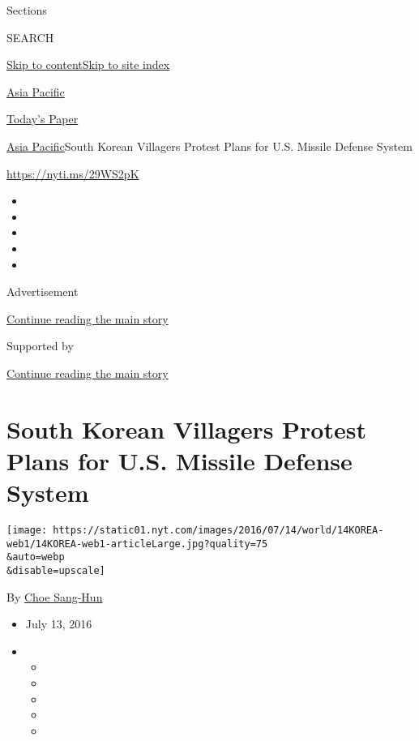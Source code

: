 Sections

SEARCH

\protect\hyperlink{site-content}{Skip to
content}\protect\hyperlink{site-index}{Skip to site index}

\href{https://www.nytimes.com/section/world/asia}{Asia Pacific}

\href{https://myaccount.nytimes.com/auth/login?response_type=cookie\&client_id=vi}{}

\href{https://www.nytimes.com/section/todayspaper}{Today's Paper}

\href{/section/world/asia}{Asia Pacific}\textbar{}South Korean Villagers
Protest Plans for U.S. Missile Defense System

\url{https://nyti.ms/29WS2pK}

\begin{itemize}
\item
\item
\item
\item
\item
\end{itemize}

Advertisement

\protect\hyperlink{after-top}{Continue reading the main story}

Supported by

\protect\hyperlink{after-sponsor}{Continue reading the main story}

\hypertarget{south-korean-villagers-protest-plans-for-us-missile-defense-system}{%
\section{South Korean Villagers Protest Plans for U.S. Missile Defense
System}\label{south-korean-villagers-protest-plans-for-us-missile-defense-system}}

\texttt{[image: https://static01.nyt.com/images/2016/07/14/world/14KOREA-web1/14KOREA-web1-articleLarge.jpg?quality=75\\\&auto=webp\\\&disable=upscale]}

By \href{http://www.nytimes.com/by/choe-sang-hun}{Choe Sang-Hun}

\begin{itemize}
\item
  July 13, 2016
\item
  \begin{itemize}
  \item
  \item
  \item
  \item
  \item
  \end{itemize}
\end{itemize}

